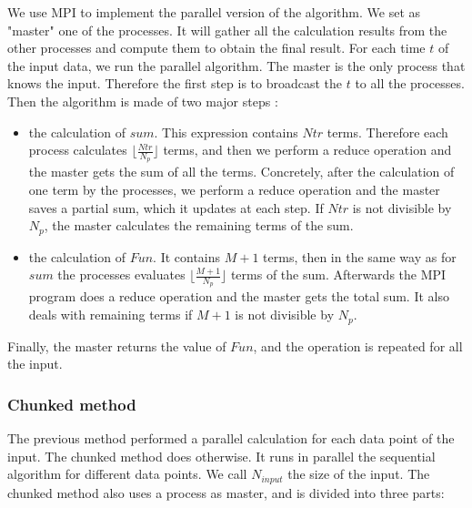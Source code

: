 \documentclass[11pt,a4paper]{article}
\begin{document}
We use MPI to implement the parallel version of the algorithm. We set as "master" one of the processes. It will gather all the calculation results from the other processes and compute them to obtain the final result. For each time $t$ of the input data, we run the parallel algorithm. The master is the only process that knows the input. Therefore the first step is to broadcast the $t$ to all the processes. Then the algorithm is made of two major steps :

\begin{itemize}

\item the calculation of $sum$. This expression contains $Ntr$ terms. Therefore each process calculates $\lfloor \frac{Ntr}{N_p}\rfloor$ terms, and then we perform a reduce operation and the master gets the sum of all the terms. Concretely, after the calculation of one term by the processes, we perform a reduce operation and the master saves a partial sum, which it updates at each step. If $Ntr$ is not divisible by $N_p$, the master calculates the remaining terms of the sum. 

\item the calculation of $Fun$. It contains $M+1$ terms, then in the same way as for $sum$ the processes evaluates $\lfloor \frac{M+1}{N_p}\rfloor$ terms of the sum. Afterwards the MPI program does a reduce operation and the master gets the total sum. It also deals with remaining terms if $M+1$ is not divisible by $N_p$.

\end{itemize}

Finally, the master returns the value of $Fun$, and the operation is repeated for all the input. 

\subsubsection{Chunked method}
The previous method performed a parallel calculation for each data point of the input. The chunked method does otherwise. It runs in parallel the sequential algorithm for different data points. We call $N_{input}$ the size of the input. The chunked method also uses a process as master, and is divided into three parts: 
\end{document}
